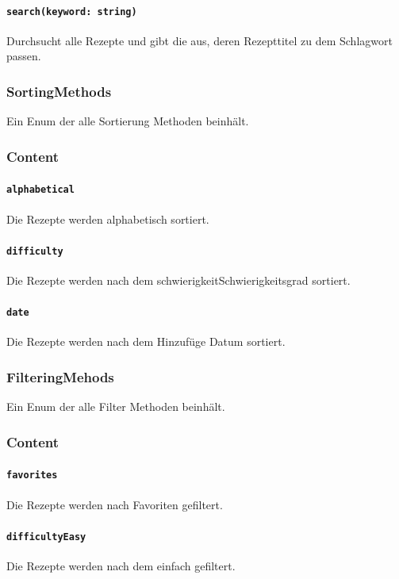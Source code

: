 \documentclass[parskip=full]{scrartcl}
\begin{document}
            \paragraph*{\texttt{search(keyword: string)}} Durchsucht alle Rezepte und gibt die aus, deren Rezepttitel zu dem Schlagwort passen.

    \subsubsection{SortingMethods}
        Ein Enum der alle Sortierung Methoden beinhält.
        \subsubsection*{Content}
            \paragraph*{\texttt{alphabetical}} Die Rezepte werden alphabetisch sortiert.
            \paragraph*{\texttt{difficulty}} Die Rezepte werden nach dem \gls{schwierigkeit}{Schwierigkeitsgrad} sortiert.
            \paragraph*{\texttt{date}} Die Rezepte werden nach dem Hinzufüge Datum sortiert.

    \subsubsection{FilteringMehods}
        Ein Enum der alle Filter Methoden beinhält.
        \subsubsection*{Content}
            \paragraph*{\texttt{favorites}} Die Rezepte werden nach Favoriten gefiltert.
            \paragraph*{\texttt{difficultyEasy}} Die Rezepte werden nach dem  einfach gefiltert.
\end{document}
